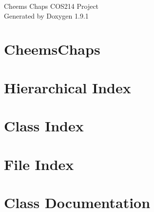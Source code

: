 \let\mypdfximage\pdfximage\def\pdfximage{\immediate\mypdfximage}\documentclass[twoside]{book}
\newcommand{\+}{\discretionary{\mbox{\scriptsize$\hookleftarrow$}}{}{}}
\newcommand{\clearemptydoublepage}{%
  \newpage{\pagestyle{empty}\cleardoublepage}%
}
\begin{document}
\raggedbottom

\hypersetup{pageanchor=false,
             bookmarksnumbered=true,
             pdfencoding=unicode
            }
\begin{titlepage}
\vspace*{7cm}
\begin{center}%
{\Large Cheems Chaps COS214 Project }\\
\vspace*{1cm}
{\large Generated by Doxygen 1.9.1}\\
\end{center}
\end{titlepage}
\clearemptydoublepage
{}
\tableofcontents
\clearemptydoublepage
{}
\hypersetup{pageanchor=true}

\chapter{Cheems\+Chaps}
\label{md_README}

\chapter{Hierarchical Index}

\chapter{Class Index}

\chapter{File Index}

\chapter{Class Documentation}









































\end{document}
